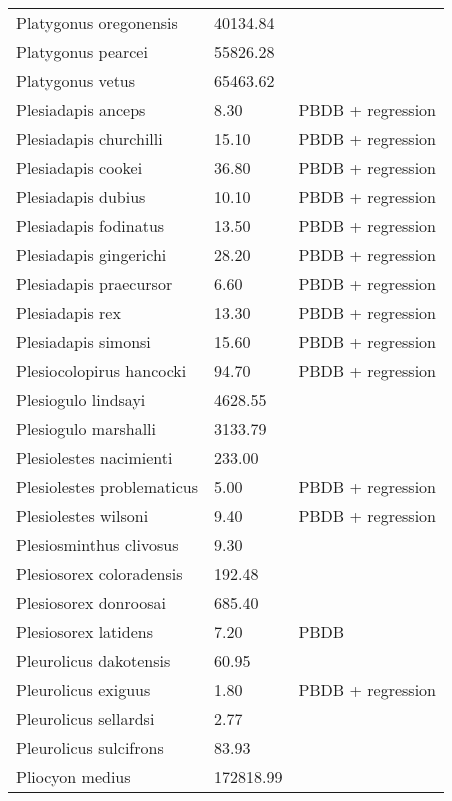 \begin{longtable}{p{} p{} p{}}
    Platygonus oregonensis & 40134.84 & \cite{Tomiya2013} \\ 
    Platygonus pearcei & 55826.28 & \cite{Tomiya2013} \\ 
    Platygonus vetus & 65463.62 & \cite{Brook2004a} \\ 
    Plesiadapis anceps & 8.30 & PBDB + regression \\ 
    Plesiadapis churchilli & 15.10 & PBDB + regression \\ 
    Plesiadapis cookei & 36.80 & PBDB + regression \\ 
    Plesiadapis dubius & 10.10 & PBDB + regression \\ 
    Plesiadapis fodinatus & 13.50 & PBDB + regression \\ 
    Plesiadapis gingerichi & 28.20 & PBDB + regression \\ 
    Plesiadapis praecursor & 6.60 & PBDB + regression \\ 
    Plesiadapis rex & 13.30 & PBDB + regression \\ 
    Plesiadapis simonsi & 15.60 & PBDB + regression \\ 
    Plesiocolopirus hancocki & 94.70 & PBDB + regression \\ 
    Plesiogulo lindsayi & 4628.55 & \cite{Tomiya2013} \\ 
    Plesiogulo marshalli & 3133.79 & \cite{Tomiya2013} \\ 
    Plesiolestes nacimienti & 233.00 & \cite{Soligo2006} \\ 
    Plesiolestes problematicus & 5.00 & PBDB + regression \\ 
    Plesiolestes wilsoni & 9.40 & PBDB + regression \\ 
    Plesiosminthus clivosus & 9.30 & \cite{Tomiya2013} \\ 
    Plesiosorex coloradensis & 192.48 & \cite{Tomiya2013} \\ 
    Plesiosorex donroosai & 685.40 & \cite{Tomiya2013} \\ 
    Plesiosorex latidens & 7.20 & PBDB \\ 
    Pleurolicus dakotensis & 60.95 & \cite{Tomiya2013} \\ 
    Pleurolicus exiguus & 1.80 & PBDB + regression \\ 
    Pleurolicus sellardsi & 2.77 & \cite{Zakrzewski1991a} \\ 
    Pleurolicus sulcifrons & 83.93 & \cite{Tomiya2013} \\ 
    Pliocyon medius & 172818.99 & \cite{Tomiya2013} \\ 

\end{longtable}
